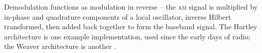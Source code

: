 \documentclass[12pt]{article}
\newcommand{\rf}{\textsc{am}\xspace}
\begin{document}
Demodulation functions as modulation in reverse -- the \rf signal is multiplied
by in-phase and quadrature components of a local oscillator, inverse Hilbert
transformed, then added back together to form the baseband signal. The Hartley
architecture is one example implementation, used since the early days of radio;
the Weaver architecture is another \autocite{rf-microelectronics}.

\printbibliography
\end{document}
